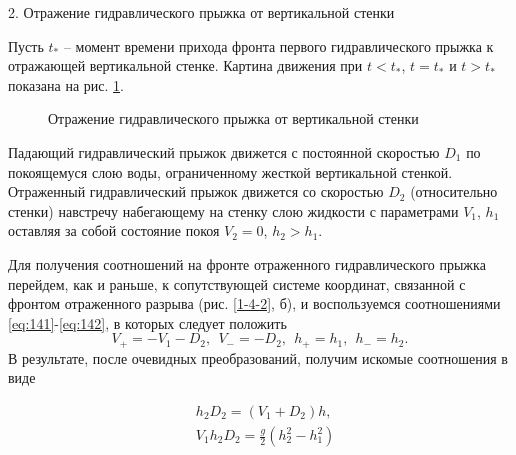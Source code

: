 \documentclass[specialist, subf, href, colorlinks=true, 14pt, final]{disser}
\theoremstyle{definition}
\begin{document}
2. Отражение гидравлического прыжка от вертикальной стенки

Пусть $t_*$ -- момент времени прихода фронта первого гидравлического прыжка к отражающей вертикальной стенке. Картина движения при $t < t_{*}$, $t = t_{*}$ и $t > t_{*}$ показана на рис. \ref{1-4-3}.
\begin{figure}[!htp]
  \caption{Отражение гидравлического прыжка от вертикальной стенки}
  \label{1-4-3}
\end{figure}

Падающий гидравлический прыжок движется с постоянной скоростью $D_1$ по покоящемуся слою воды, ограниченному жесткой вертикальной стенкой. Отраженный гидравлический прыжок движется со скоростью $D_2$ (относительно стенки) навстречу набегающему на стенку слою жидкости с параметрами $V_1$, $h_1$ оставляя за собой состояние покоя $V_2 = 0$, $h_{2} > h_{1}$.

Для получения соотношений на фронте отраженного гидравлического прыжка перейдем, как и раньше, к сопутствующей системе координат, связанной с фронтом отраженного разрыва (рис. \ref{1-4-2}, б), и воспользуемся соотношениями \eqref{eq:141}-\eqref{eq:142}, в которых следует положить
\[
  V_{+} = -V_{1}-D_{2},\ \ V_{-} = -D_{2},\ \ h_{+}=h_{1},\ \ h_{-}=h_{2}.
\]
В результате, после очевидных преобразований, получим искомые соотношения в виде
\addtocounter{equation}{1}
\begin{equation}\label{eq:149}
  \begin{aligned}
  & h_{2}D_{2} = (V_{1}+D_{2})h,\\
  & V_{1}h_{2}D_{2} = \frac{g}{2} \left( h_{2}^{2} - h_{1}^{2} \right)
  \end{aligned}
  \tag{9}
\end{equation}
\end{document}
